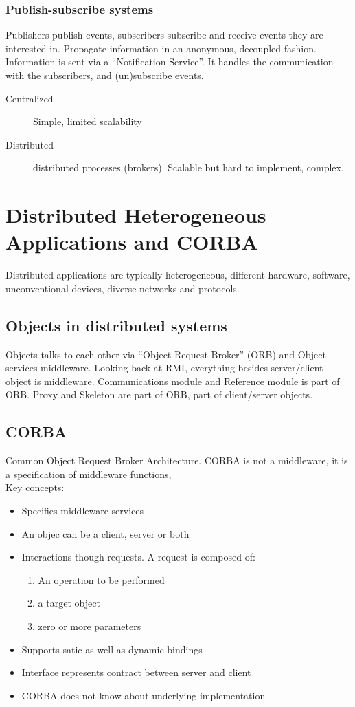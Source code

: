 \documentclass[a4paper]{article}
\begin{document}
\subsubsection{Publish-subscribe systems}
Publishers publish events, subscribers subscribe and receive events they are
interested in. Propagate information in an anonymous, decoupled fashion.
Information is sent via a ``Notification Service''. It handles the communication
with the subscribers, and (un)subscribe events.

\begin{description}
	\item[Centralized] Simple, limited scalability
	\item[Distributed] distributed processes (brokers). Scalable but hard to
		implement, complex.
\end{description}

\section{Distributed Heterogeneous Applications and CORBA}
Distributed applications are typically heterogeneous, different hardware,
software, unconventional devices, diverse networks and protocols.
\subsection{Objects in distributed systems}
Objects talks to each other via ``Object Request Broker'' (ORB) and Object
services middleware. Looking back at RMI, everything besides server/client
object is middleware. Communications module and Reference module is part of ORB.
Proxy and Skeleton are part of ORB, part of client/server objects.

\subsection{CORBA}
Common Object Request Broker Architecture. CORBA is not a middleware, it is a
specification of middleware functions,\\
Key concepts:
\begin{itemize}
	\item Specifies middleware services
	\item An objec can be a client, server or both
	\item Interactions though requests. A request is composed of:
		\begin{enumerate}
			\item An operation to be performed
			\item a target object
			\item zero or more parameters
		\end{enumerate}
	\item Supports satic as well as dynamic bindings
	\item Interface represents contract between server and client
	\item CORBA does not know about underlying implementation
\end{itemize}
\end{document}
